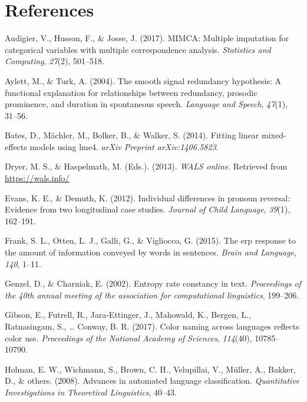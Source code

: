 \documentclass[11pt,]{article}
\begin{document}
\hypertarget{references}{%
\section*{References}\label{references}}

\hypertarget{refs}{}
\leavevmode\hypertarget{ref-audigier2017mimca}{}%
Audigier, V., Husson, F., \& Josse, J. (2017). MIMCA: Multiple imputation for categorical variables with multiple correspondence analysis. \emph{Statistics and Computing}, \emph{27}(2), 501--518.

\leavevmode\hypertarget{ref-aylett2004smooth}{}%
Aylett, M., \& Turk, A. (2004). The smooth signal redundancy hypothesis: A functional explanation for relationships between redundancy, prosodic prominence, and duration in spontaneous speech. \emph{Language and Speech}, \emph{47}(1), 31--56.

\leavevmode\hypertarget{ref-bates2014fitting}{}%
Bates, D., Mächler, M., Bolker, B., \& Walker, S. (2014). Fitting linear mixed-effects models using lme4. \emph{arXiv Preprint arXiv:1406.5823}.

\leavevmode\hypertarget{ref-wals}{}%
Dryer, M. S., \& Haspelmath, M. (Eds.). (2013). \emph{WALS online}. Retrieved from \url{https://wals.info/}

\leavevmode\hypertarget{ref-evans2012individual}{}%
Evans, K. E., \& Demuth, K. (2012). Individual differences in pronoun reversal: Evidence from two longitudinal case studies. \emph{Journal of Child Language}, \emph{39}(1), 162--191.

\leavevmode\hypertarget{ref-frank2015erp}{}%
Frank, S. L., Otten, L. J., Galli, G., \& Vigliocco, G. (2015). The erp response to the amount of information conveyed by words in sentences. \emph{Brain and Language}, \emph{140}, 1--11.

\leavevmode\hypertarget{ref-genzel2002entropy}{}%
Genzel, D., \& Charniak, E. (2002). Entropy rate constancy in text. \emph{Proceedings of the 40th annual meeting of the association for computational linguistics}, 199--206.

\leavevmode\hypertarget{ref-gibson2017color}{}%
Gibson, E., Futrell, R., Jara-Ettinger, J., Mahowald, K., Bergen, L., Ratnasingam, S., \ldots{} Conway, B. R. (2017). Color naming across languages reflects color use. \emph{Proceedings of the National Academy of Sciences}, \emph{114}(40), 10785--10790.

\leavevmode\hypertarget{ref-holman2008advances}{}%
Holman, E. W., Wichmann, S., Brown, C. H., Velupillai, V., Müller, A., Bakker, D., \& others. (2008). Advances in automated language classification. \emph{Quantitative Investigations in Theoretical Linguistics}, 40--43.
\end{document}
